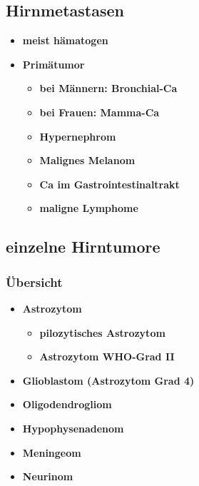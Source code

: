 	\subsection{Hirnmetastasen}
		\begin{itemize}
			\item \textbf{meist hämatogen}
			\item \textbf{Primätumor}
				\begin{itemize}
					\item \textbf{bei Männern: Bronchial-Ca}
					\item \textbf{bei Frauen: Mamma-Ca}
					\item \textbf{Hypernephrom}
					\item \textbf{Malignes Melanom}
					\item \textbf{Ca im Gastrointestinaltrakt}
					\item \textbf{maligne Lymphome}
				\end{itemize}
		\end{itemize}
	\subsection{einzelne Hirntumore}
		\subsubsection{Übersicht}
			\begin{itemize}
				\item \textbf{Astrozytom}
					\begin{itemize}
						\item \textbf{pilozytisches Astrozytom}
						\item \textbf{Astrozytom WHO-Grad II}
					\end{itemize}					
				\item \textbf{Glioblastom (Astrozytom Grad 4)}
				\item \textbf{Oligodendrogliom}
				\item \textbf{Hypophysenadenom}
				\item \textbf{Meningeom}
				\item \textbf{Neurinom}
			\end{itemize}
